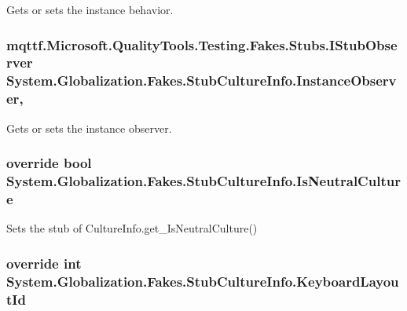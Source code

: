 Gets or sets the instance behavior.

\hypertarget{class_system_1_1_globalization_1_1_fakes_1_1_stub_culture_info_a6b7cb5bc79c7f118c67d1cef2a02b3c8}{
\subsubsection[{Instance\-Observer}]{\setlength{\rightskip}{0pt plus 5cm}mqttf.\-Microsoft.\-Quality\-Tools.\-Testing.\-Fakes.\-Stubs.\-I\-Stub\-Observer System.\-Globalization.\-Fakes.\-Stub\-Culture\-Info.\-Instance\-Observer\hspace{0.3cm}{\ttfamily [get]}, {\ttfamily [set]}}}\label{class_system_1_1_globalization_1_1_fakes_1_1_stub_culture_info_a6b7cb5bc79c7f118c67d1cef2a02b3c8}


Gets or sets the instance observer.

\hypertarget{class_system_1_1_globalization_1_1_fakes_1_1_stub_culture_info_a3f78796ed5c3254be1b14d5ceffa6363}{
\subsubsection[{Is\-Neutral\-Culture}]{\setlength{\rightskip}{0pt plus 5cm}override bool System.\-Globalization.\-Fakes.\-Stub\-Culture\-Info.\-Is\-Neutral\-Culture\hspace{0.3cm}{\ttfamily [get]}}}\label{class_system_1_1_globalization_1_1_fakes_1_1_stub_culture_info_a3f78796ed5c3254be1b14d5ceffa6363}


Sets the stub of Culture\-Info.\-get\-\_\-\-Is\-Neutral\-Culture()

\hypertarget{class_system_1_1_globalization_1_1_fakes_1_1_stub_culture_info_a1a2036b4fec133eff8bfeeba7706bf24}{
\subsubsection[{Keyboard\-Layout\-Id}]{\setlength{\rightskip}{0pt plus 5cm}override int System.\-Globalization.\-Fakes.\-Stub\-Culture\-Info.\-Keyboard\-Layout\-Id\hspace{0.3cm}{\ttfamily [get]}}}\label{class_system_1_1_globalization_1_1_fakes_1_1_stub_culture_info_a1a2036b4fec133eff8bfeeba7706bf24}


